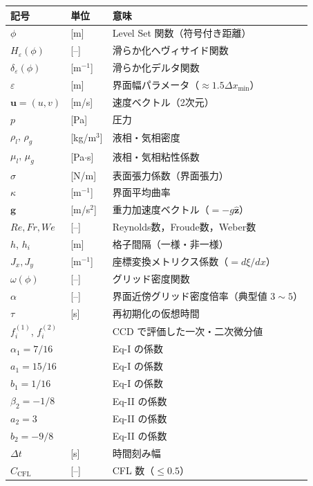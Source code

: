 \documentclass[12pt, a4paper, titlepage]{article}
\newcommand{\jp}[1]{{\normalfont\jpfont #1}}
\newcommand{\bu}{\bm{u}}
\newcommand{\bg}{\bm{g}}
\begin{document}
\begin{table}[h]
\centering
\small
\begin{tabular}{llp{70mm}}
\toprule
\jp{記号} & \jp{単位} & \jp{意味}\\
\midrule
$\phi$ & [m] & Level Set \jp{関数（符号付き距離）}\\
$H_\varepsilon(\phi)$ & [--] & \jp{滑らか化ヘヴィサイド関数}\\
$\delta_\varepsilon(\phi)$ & [m$^{-1}$] & \jp{滑らか化デルタ関数}\\
$\varepsilon$ & [m] & \jp{界面幅パラメータ（$\approx 1.5\Delta x_{\min}$）}\\
$\bu = (u,v)$ & [m/s] & \jp{速度ベクトル（2次元）}\\
$p$ & [Pa] & \jp{圧力}\\
$\rho_l,\,\rho_g$ & [kg/m$^3$] & \jp{液相・気相密度}\\
$\mu_l,\,\mu_g$ & [Pa$\cdot$s] & \jp{液相・気相粘性係数}\\
$\sigma$ & [N/m] & \jp{表面張力係数（界面張力）}\\
$\kappa$ & [m$^{-1}$] & \jp{界面平均曲率}\\
$\bg$ & [m/s$^2$] & \jp{重力加速度ベクトル（$=-g\hat{\bm{z}}$）}\\
$Re, Fr, We$ & [--] & Reynolds\jp{数，}Froude\jp{数，}Weber\jp{数}\\
$h$, $h_i$ & [m] & \jp{格子間隔（一様・非一様）}\\
$J_x, J_y$ & [m$^{-1}$] & \jp{座標変換メトリクス係数（$=d\xi/dx$）}\\
$\omega(\phi)$ & [--] & \jp{グリッド密度関数}\\
$\alpha$ & [--] & \jp{界面近傍グリッド密度倍率（典型値 $3\sim5$）}\\
$\tau$ & [s] & \jp{再初期化の仮想時間}\\
$f^{(1)}_i$, $f^{(2)}_i$ & & \jp{CCD で評価した一次・二次微分値}\\
$\alpha_1=7/16$ & & Eq-I \jp{の係数}\\
$a_1=15/16$ & & Eq-I \jp{の係数}\\
$b_1=1/16$ & & Eq-I \jp{の係数}\\
$\beta_2=-1/8$ & & Eq-II \jp{の係数}\\
$a_2=3$ & & Eq-II \jp{の係数}\\
$b_2=-9/8$ & & Eq-II \jp{の係数}\\
$\Delta t$ & [s] & \jp{時間刻み幅}\\
$C_{\mathrm{CFL}}$ & [--] & \jp{CFL 数（$\leq 0.5$）}\\
\bottomrule
\end{tabular}
\end{table}
\end{document}
